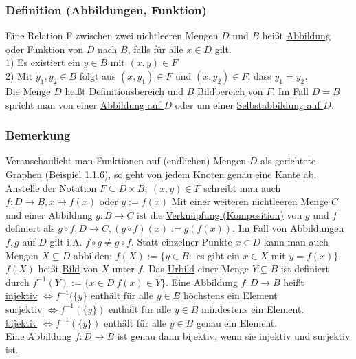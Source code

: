 \subsubsection{Definition (Abbildungen, Funktion)}
Eine Relation F zwischen zwei nichtleeren Mengen $D$ und $B$ heißt \underline{Abbildung} oder \underline{Funktion} von $D$ nach $B$, falls f\"{u}r alle $x\in D$ gilt.\\
1) Es existiert ein $y\in B$ mit $(x,y) \in F$\\
2) Mit $y_1,y_2\in B$ folgt aus $(x,y_1) \in F$ und $(x,y_2)\in F$, dass $y_1=y_2$.\\
Die Menge $D$ heißt \underline{Definitionsbereich}  und $B$ \underline{Bildbereich} von $F$.  Im Fall $D=B$ spricht man von einer \underline{Abbildung auf $D$} oder um einer \underline{Selbstabbildung auf $D$}.
\subsubsection{Bemerkung}
Veranschaulicht man Funktionen auf (endlichen) Mengen $D$ als gerichtete Graphen (Beispiel 1.1.6), so geht von jedem Knoten genau eine Kante ab.
Anstelle der Notation $F \subseteq D \times B,\ (x,y)\in F$ schreibt man auch $f:D\rightarrow B, x\mapsto f(x)$ oder $y:=f(x)$
Mit einer weiteren nichtleeren Menge $C$ und einer Abbildung $g:B\rightarrow C$ ist die \underline{Verknüpfung (Komposition)} von $g$ und $f$ definiert als $g\circ f: D\rightarrow C, (g\circ f)(x):=g(f(x))$.  Im Fall von Abbildungen $f,g$ auf $D$ gilt i.A. $f\circ g\not = g\circ f$.
Statt einzelner Punkte $x\in D$ kann man auch Mengen $X\subseteq D$ abbilden: $f(X):=\{y\in B:$ es gibt ein $x\in X$ mit $y=f(x)\}$.  $f(X)$ heißt \underline{Bild} von $X$ unter $f$.  Das \underline{Urbild} einer Menge $Y\subseteq B$ ist definiert durch $f^{-1}(Y):=\{x\in D\ f(x)\in Y\}$.  Eine Abbildung $f:D\rightarrow B$ heißt \\
\underline{injektiv} $\Leftrightarrow f^{-1}(\{y\}$ enthält für alle $y\in B$ höchstens ein Element \\
\underline{surjektiv} $\Leftrightarrow f^{-1}(\{y\})$ enthält für alle $y\in B$ mindestens ein Element. \\
\underline{bijektiv} $\Leftrightarrow f^{-1}(\{y\})$ enthält für alle $y\in B$ genau ein Element. \\
Eine Abbildung $f:D\rightarrow B$ ist genau dann bijektiv, wenn sie injektiv und surjektiv ist.\\
